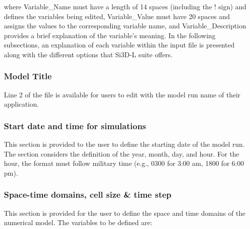 \noindent where Variable\_Name must have a length of 14 spaces (including the ! sign) and defines the variables being edited, Variable\_Value must have 20 spaces and assigns the values to the corresponding variable name, and Variable\_Description provides a brief explanation of the variable's meaning. In the following subsections, an explanation of each variable within the input file is presented along with the different options that Si3D-L suite offers.

\subsubsection{Model Title}
Line 2 of the file is available for users to edit with the model run name of their application. 
\subsubsection{Start date and time for simulations}
This section is provided to the user to define the starting date of the model run. The section considers the definition of the year, month, day, and hour. For the hour, the format must follow military time (e.g., 0300 for 3:00 am, 1800 for 6:00 pm). 
\subsubsection{Space-time domains, cell size \& time step}
This section is provided for the user to define the space and time domains of the numerical model. The variables to be defined are:

